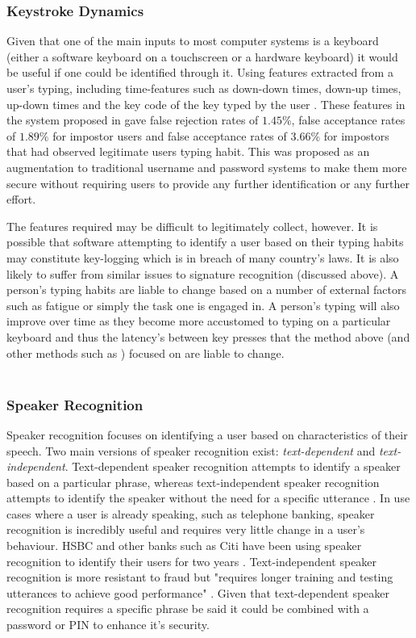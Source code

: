 \documentclass[12pt]{article}
\begin{document}
	\subsubsection{Keystroke Dynamics}
	\label{subsubsect:keystroke_dynamics}
	Given that one of the main inputs to most computer systems is a keyboard (either a software keyboard on a touchscreen or a hardware keyboard) it would be useful if one could be identified through it. Using features extracted from a user's typing, including time-features such as down-down times, down-up times, up-down times and the key code of the key typed by the user \citep{typing_auth2005}. These features in the system proposed in \cite{typing_auth2005} gave false rejection rates of $1.45\%$, false acceptance rates of $1.89\%$ for impostor users and false acceptance rates of $3.66\%$ for impostors that had observed legitimate users typing habit. This was proposed as an augmentation to traditional username and password systems to make them more secure without requiring users to provide any further identification or any further effort.
	
	The features required may be difficult to legitimately collect, however. It is possible that software attempting to identify a user based on their typing habits may constitute key-logging which is in breach of many country's laws. It is also likely to suffer from similar issues to signature recognition (discussed above). A person's typing habits are liable to change based on a number of external factors such as fatigue or simply the task one is engaged in. A person's typing will also improve over time as they become more accustomed to typing on a particular keyboard and thus the latency's between key presses that the method above (and other methods such as \cite{shepherd_ibm_keystroke_auth1995}) focused on are liable to change.
	\\
	\\
	\subsubsection{Speaker Recognition}
	\label{subsubsect:speaker_recognition}
	Speaker recognition focuses on identifying a user based on characteristics of their speech. Two main versions of speaker recognition exist: \emph{text-dependent} and \emph{text-independent}. Text-dependent speaker recognition attempts to identify a speaker based on a particular phrase, whereas text-independent speaker recognition attempts to identify the speaker without the need for a specific utterance \citep{microsoft_2006}. In use cases where a user is already speaking, such as telephone banking, speaker recognition is incredibly useful and requires very little change in a user's behaviour. HSBC and other banks such as Citi have been using speaker recognition to identify their users for two years \citep{kollewe_2016}. Text-independent speaker recognition is more resistant to fraud \citep{jain2004introduction} but "requires longer training and testing utterances to achieve good performance" \citep{microsoft_2006}. Given that text-dependent speaker recognition requires a specific phrase be said it could be combined with a password or PIN to enhance it's security.
	
\end{document}
